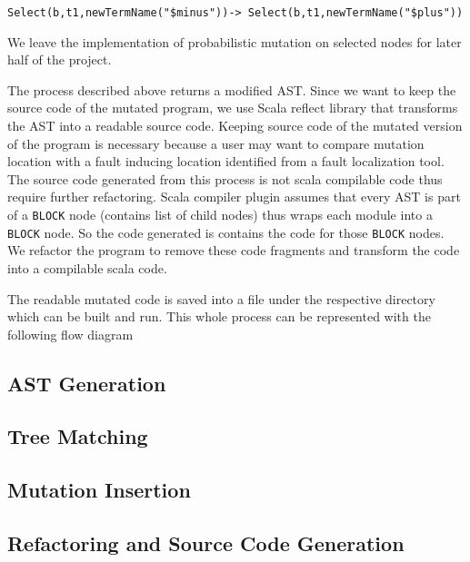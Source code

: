 \begin{center}
\texttt{Select(b,t1,newTermName("\$minus"))-> Select(b,t1,newTermName("\$plus"))}
\end{center}

We leave the implementation of probabilistic mutation on selected nodes for later half of the project. 

The process described above returns a modified AST.  Since we want to keep the source code of the mutated program, we use Scala reflect library that transforms the AST into a readable source code. Keeping source code of the mutated version of the program is necessary because a user may want to compare mutation location with a fault inducing location identified from a fault localization tool. The source code generated from this process is not scala compilable code thus require further refactoring. Scala compiler plugin assumes that every AST is part of a \texttt{BLOCK}  node (contains list of child nodes) thus wraps each module into a \texttt{BLOCK} node. So the code generated is contains the code for those \texttt{BLOCK} nodes. We refactor the program to remove these code fragments and transform the code into a compilable scala code. 

The readable mutated code is saved into a file under the respective directory which can be built and run. This whole process can be represented with the following flow diagram


\subsection{AST Generation}
\subsection{Tree Matching}
\subsection{Mutation Insertion}
\subsection{Refactoring and Source Code Generation}



